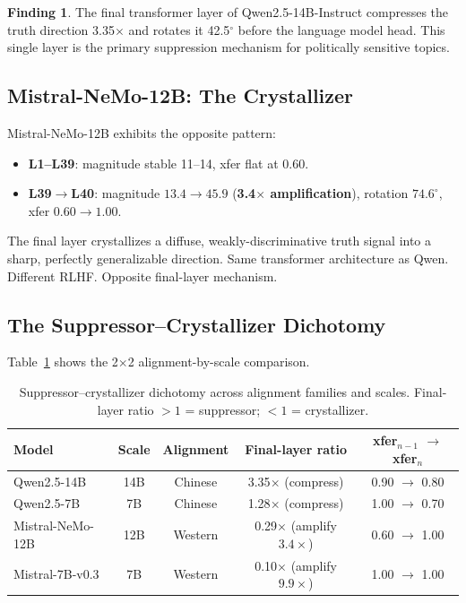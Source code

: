 \documentclass[12pt]{article}
\theoremstyle{definition}
\newtheorem{finding}{Finding}
\begin{document}
\begin{finding}
The final transformer layer of Qwen2.5-14B-Instruct compresses the truth direction
3.35$\times$ and rotates it 42.5$^\circ$ before the language model head. This single layer
is the primary suppression mechanism for politically sensitive topics.
\end{finding}

\subsection{Mistral-NeMo-12B: The Crystallizer}
\label{sec:mistral_nemo}

Mistral-NeMo-12B exhibits the opposite pattern:
\begin{itemize}
  \item \textbf{L1--L39}: magnitude stable 11--14, xfer flat at 0.60.
  \item \textbf{L39$\to$L40}: magnitude $13.4 \to 45.9$ (\textbf{3.4$\times$ amplification}),
  rotation $74.6^\circ$, xfer $0.60 \to 1.00$.
\end{itemize}

The final layer crystallizes a diffuse, weakly-discriminative truth signal into a sharp,
perfectly generalizable direction. Same transformer architecture as Qwen. Different RLHF.
Opposite final-layer mechanism.

\subsection{The Suppressor--Crystallizer Dichotomy}
\label{sec:dichotomy}

Table~\ref{tab:2x2} shows the 2$\times$2 alignment-by-scale comparison.

\begin{table}[H]
\centering
\caption{Suppressor--crystallizer dichotomy across alignment families and scales.
Final-layer ratio $> 1$ = suppressor; $< 1$ = crystallizer.}
\label{tab:2x2}
\begin{tabular}{lcccc}
\toprule
\textbf{Model} & \textbf{Scale} & \textbf{Alignment} &
\textbf{Final-layer ratio} & \textbf{xfer$_{n-1}$ $\to$ xfer$_n$} \\
\midrule
\rowcolor{suppresscolor!15}
Qwen2.5-14B & 14B & Chinese & 3.35$\times$ (compress) & 0.90 $\to$ 0.80 \\
\rowcolor{suppresscolor!8}
Qwen2.5-7B  & 7B  & Chinese & 1.28$\times$ (compress) & 1.00 $\to$ 0.70 \\
\midrule
\rowcolor{crystalcolor!15}
Mistral-NeMo-12B & 12B & Western & 0.29$\times$ (amplify $3.4\times$) & 0.60 $\to$ 1.00 \\
\rowcolor{crystalcolor!8}
Mistral-7B-v0.3  & 7B  & Western & 0.10$\times$ (amplify $9.9\times$) & 1.00 $\to$ 1.00 \\
\bottomrule
\end{tabular}
\end{table}
\end{document}
